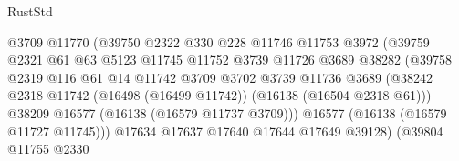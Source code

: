 \begin{lexlean}{RustStd}
\begin{coremodule}
                                        @3709
                                        @11770
                                        (@39750
                                          @2322
                                          @330
                                          @228
                                          @11746
                                          @11753
                                          @3972
                                          (@39759
                                            @2321
                                            @61
                                            @63
                                            @5123
                                            @11745
                                            @11752
                                            @3739
                                            @11726
                                            @3689
                                            @38282
                                            (@39758
                                              @2319
                                              @116
                                              @61
                                              @14
                                              @11742
                                              @3709
                                              @3702
                                              @3739
                                              @11736
                                              @3689
                                              (@38242
                                                @2318
                                                @11742
                                                (@16498 (@16499 @11742))
                                                (@16138 (@16504 @2318 @61)))
                                              @38209
                                              @16577
                                              (@16138 (@16579 @11737 @3709)))
                                            @16577
                                            (@16138 (@16579 @11727 @11745)))
                                          @17634
                                          @17637
                                          @17640
                                          @17644
                                          @17649
                                          @39128)
                                        (@39804
                                          @11755
                                          @2330

\end{coremodule}
\end{lexlean}

